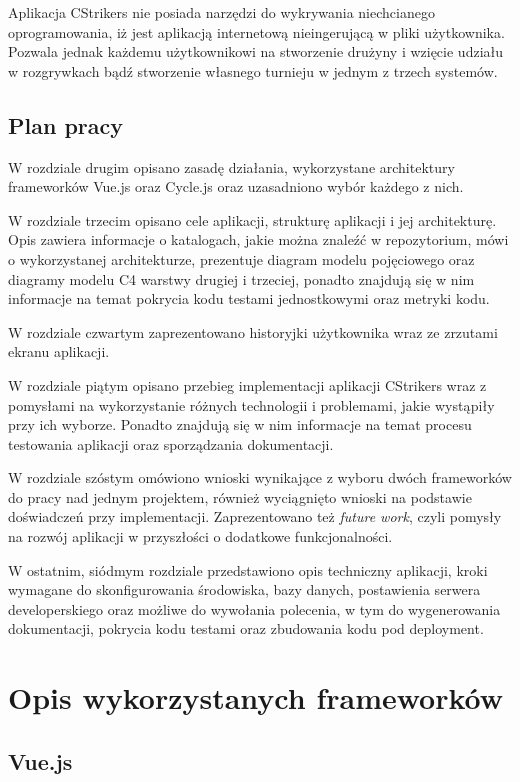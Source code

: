 \documentclass[shortabstract]{iithesis}
\theoremstyle{definition} \newtheorem{definition}{Definicja}[]
\theoremstyle{remark} \newtheorem{remark}[definition]{Observation}
\theoremstyle{plain} \newtheorem{theorem}[definition]{Theorem}
\theoremstyle{plain} \newtheorem{lemma}[definition]{Lemma}
\begin{document}
Aplikacja CStrikers nie posiada narzędzi do wykrywania niechcianego oprogramowania, iż jest aplikacją internetową nieingerującą w pliki użytkownika. Pozwala jednak każdemu użytkownikowi na stworzenie drużyny i wzięcie udziału w rozgrywkach bądź stworzenie własnego turnieju w jednym z trzech systemów.

\section{Plan pracy}
W rozdziale drugim opisano zasadę działania, wykorzystane architektury frameworków Vue.js oraz Cycle.js oraz uzasadniono wybór każdego z nich.

W rozdziale trzecim opisano cele aplikacji, strukturę aplikacji i jej architekturę. Opis zawiera informacje o katalogach, jakie można znaleźć w repozytorium, mówi o wykorzystanej architekturze, prezentuje diagram modelu pojęciowego oraz diagramy modelu C4 warstwy drugiej i trzeciej, ponadto znajdują się w nim informacje na temat pokrycia kodu testami jednostkowymi oraz metryki kodu.

W rozdziale czwartym zaprezentowano historyjki użytkownika wraz ze zrzutami ekranu aplikacji.

W rozdziale piątym opisano przebieg implementacji aplikacji CStrikers wraz z pomysłami na wykorzystanie różnych technologii i problemami, jakie wystąpiły przy ich wyborze. Ponadto znajdują się w nim informacje na temat procesu testowania aplikacji oraz sporządzania dokumentacji.

W rozdziale szóstym omówiono wnioski wynikające z wyboru dwóch frameworków do pracy nad jednym projektem, również wyciągnięto wnioski na podstawie doświadczeń przy implementacji. Zaprezentowano też \textit{future work}, czyli pomysły na rozwój aplikacji w przyszłości o dodatkowe funkcjonalności.

W ostatnim, siódmym rozdziale przedstawiono opis techniczny aplikacji, kroki wymagane do skonfigurowania środowiska, bazy danych, postawienia serwera developerskiego oraz możliwe do wywołania polecenia, w tym do wygenerowania dokumentacji, pokrycia kodu testami oraz zbudowania kodu pod deployment.


\chapter{Opis wykorzystanych frameworków}
\section{Vue.js}
\end{document}
